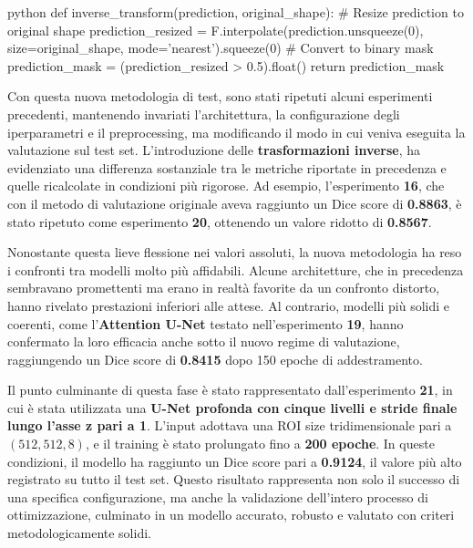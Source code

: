 \begin{code}{python}
def inverse_transform(prediction, original_shape):
    # Resize prediction to original shape
    prediction_resized = F.interpolate(prediction.unsqueeze(0), 
                                       size=original_shape, 
                                       mode='nearest').squeeze(0)   
    # Convert to binary mask   
    prediction_mask = (prediction_resized > 0.5).float()
    return prediction_mask
\end{code}


Con questa nuova metodologia di test, sono stati ripetuti alcuni esperimenti precedenti, mantenendo invariati l’architettura, la configurazione degli iperparametri e il preprocessing, ma modificando il modo in cui veniva eseguita la valutazione sul test set. L’introduzione delle \textbf{trasformazioni inverse}, ha evidenziato una differenza sostanziale tra le metriche riportate in precedenza e quelle ricalcolate in condizioni più rigorose. Ad esempio, l’esperimento \textbf{16}, che con il metodo di valutazione originale aveva raggiunto un Dice score di \textbf{0.8863}, è stato ripetuto come esperimento \textbf{20}, ottenendo un valore ridotto di \textbf{0.8567}. 

Nonostante questa lieve flessione nei valori assoluti, la nuova metodologia ha reso i confronti tra modelli molto più affidabili. Alcune architetture, che in precedenza sembravano promettenti ma erano in realtà favorite da un confronto distorto, hanno rivelato prestazioni inferiori alle attese. Al contrario, modelli più solidi e coerenti, come l’\textbf{Attention U-Net} testato nell’esperimento \textbf{19}, hanno confermato la loro efficacia anche sotto il nuovo regime di valutazione, raggiungendo un Dice score di \textbf{0.8415} dopo 150 epoche di addestramento.

Il punto culminante di questa fase è stato rappresentato dall’esperimento \textbf{21}, in cui è stata utilizzata una \textbf{U-Net profonda con cinque livelli e stride finale lungo l’asse z pari a 1}. L’input adottava una ROI size tridimensionale pari a $(512, 512, 8)$, e il training è stato prolungato fino a \textbf{200 epoche}. In queste condizioni, il modello ha raggiunto un Dice score pari a \textbf{0.9124}, il valore più alto registrato su tutto il test set. Questo risultato rappresenta non solo il successo di una specifica configurazione, ma anche la validazione dell’intero processo di ottimizzazione, culminato in un modello accurato, robusto e valutato con criteri metodologicamente solidi.

